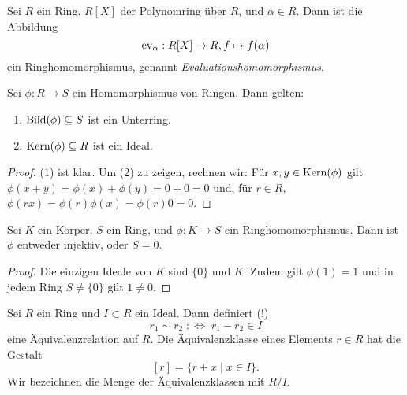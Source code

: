 \documentclass{book}
\begin{document}
\begin{exa}
    \label{exa:evaluation}
    Sei $R$ ein Ring, $R[X]$ der Polynomring über $R$, und $\alpha \in R$. Dann ist die Abbildung
    \[
        \operatorname{ev}_{\alpha}: R[X] \to R, f \mapsto f(\alpha)
    \]
    ein Ringhomomorphismus, genannt \emph{Evaluationshomomorphismus}.
\end{exa}

\begin{prop}
    \label{prop:kern}
    Sei $\phi: R \to S$ ein Homomorphismus von Ringen. Dann gelten:
    \begin{enumerate}
        \item $\Bild(\phi) \subset S$ ist ein Unterring. 
        \item $\Kern(\phi) \subset R$ ist ein Ideal.
    \end{enumerate}
\end{prop}
\begin{proof}
    (1) ist klar. Um (2) zu zeigen, rechnen wir: Für $x,y \in \Kern(\phi)$ gilt
    $\phi(x+y) = \phi(x) + \phi(y) = 0 + 0 = 0$ und, für $r \in R$, $\phi(rx) =
    \phi(r)\phi(x) = \phi(r) 0 = 0$.
\end{proof}

\begin{cor}
    \label{cor:fieldring}
    Sei $K$ ein Körper, $S$ ein Ring, und $\phi: K \to S$ ein Ringhomomorphismus. Dann ist $\phi$ entweder injektiv, oder $S = 0$. 
\end{cor}
\begin{proof}
    Die einzigen Ideale von $K$ sind $\{0\}$ und $K$. Zudem gilt $\phi(1) = 1$
    und in jedem Ring $S \ne \{0\}$ gilt $1 \ne 0$. 
\end{proof}

Sei $R$ ein Ring und $I \subset R$ ein Ideal. Dann definiert (!) 
\[
    r_1 \sim r_2 \; : \Leftrightarrow\; r_1 - r_2 \in I
\]
eine Äquivalenzrelation auf $R$. Die Äquivalenzklasse eines Elements $r \in R$
hat die Gestalt
\[
    [r] = \{r + x \;|\; x \in I\}.
\]
Wir bezeichnen die Menge der Äquivalenzklassen mit $R/I$. 
\end{document}
